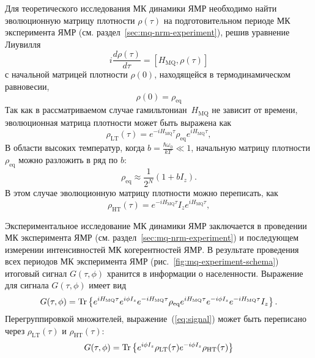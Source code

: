Для теоретического исследования МК динамики ЯМР
необходимо найти эволюционную матрицу плотности $\rho(\tau)$
на подготовительном периоде МК эксперимента ЯМР (см. раздел~\ref{sec:mq-nrm-experiment}),
решив уравнение Лиувилля~\cite{Feldman2012}
%
\begin{equation}
    \label{eq:liouvile}
    i \dfrac{d\rho(\tau)}{d \tau} =
    \left[H_\mathrm{MQ}, \rho(\tau)\right]
\end{equation}
%
с начальной матрицей плотности $\rho(0)$,
находящейся в термодинамическом равновесии,
%
\begin{equation}
    \label{eq:rho_init}
    \rho(0) = \rho_{\mathrm{eq}}
\end{equation}
%
Так как в рассматриваемом случае гамильтониан~$H_\mathrm{MQ}$
не зависит от времени,
эволюционная матрица плотности может быть выражена как
\begin{equation}
  \label{eq:rho_eval_lt}
  \rho_\mathrm{LT} (\tau) = e^{-iH_\mathrm{MQ}\tau} \rho_\mathrm{eq} e^{iH_\mathrm{MQ}\tau},
\end{equation}
В области высоких температур,
когда $b = \frac{\hbar\omega_{0}}{kT} \ll 1$,
начальную матрицу плотности $\rho_{\mathrm{eq}}$ можно разложить в ряд по $b$:
%
\begin{equation}
  \label{eq:rho_ht}
  \rho_{\mathrm{eq}} \approx \dfrac{1}{2^N} (1 + bI_z).
\end{equation}
%
В этом случае эволюционную матрицу плотности можно переписать, как
\begin{equation}
  \label{eq:rho_eval_ht}
  \rho_\mathrm{HT} (\tau) =  e^{-iH_\mathrm{MQ}\tau} I_z e^{iH_\mathrm{MQ}\tau},
\end{equation}

Экспериментальное исследование МК динамики ЯМР заключается в проведении
МК эксперимента ЯМР (см. раздел~\ref{sec:mq-nrm-experiment})
и последующем измерении интенсивностей МК когерентностей ЯМР.
В результате проведения всех периодов МК эксперимента ЯМР (рис.~\ref{fig:mq-experiment-schema})
итоговый сигнал $G(\tau, \phi)$ хранится в информации о населенности\cite{Feldman1997}.
Выражение для сигнала $G(\tau, \phi)$ имеет вид
%
\begin{equation}
  \label{eq:signal}
   G(\tau, \phi)
   = \mathrm{Tr} \left\{ 
     e^{iH_\mathrm{MQ}\tau} e^{i\phi I_z} e^{-iH_\mathrm{MQ}\tau}
     \rho_\mathrm{eq}
     e^{iH_\mathrm{MQ}\tau} e^{-i\phi I_z} e^{-iH_\mathrm{MQ}\tau}
     I_z
     \right\}.
\end{equation}
%
Перегруппировкой множителей,
выражение~(\ref{eq:signal}) может быть переписано через
 $\rho_\mathrm{LT} (\tau)$ и $\rho_\mathrm{HT} (\tau)$:
%
\begin{equation}
  \label{eq:signal-short}
  G(\tau, \phi) = \mathrm{Tr} \left\{ 
   e^{i\phi I_z} \rho_\mathrm{LT} (\tau)
   e^{-i\phi I_z} \rho_\mathrm{HT} (\tau)
   \right\}
\end{equation}


